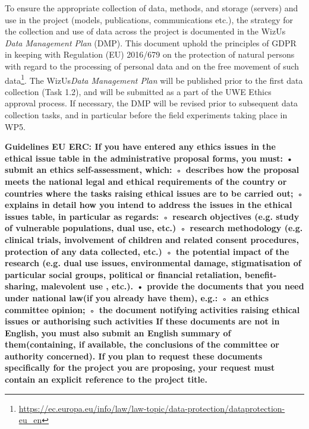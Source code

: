 \documentclass[11pt,a4paper]{report}
\newcommand{\project}{WizUs\xspace}
\newcommand{\eu}[1]{{\color{teal}\textbf{Guidelines EU ERC: #1}}}
\begin{document}
To ensure the appropriate collection of data, methods, and storage (servers) and
use in the project (models, publications, communications etc.), the strategy for
the collection and use of data across the project is documented in the \project
\emph{Data Management Plan} (DMP). This document uphold the principles of GDPR in
keeping with Regulation (EU) 2016/679 on the protection of natural persons with
regard to the processing of personal data and on the free movement of such
data\footnote{\url{https://ec.europa.eu/info/law/law-topic/data-protection/dataprotection-eu_en}}.
The \project \emph{Data Management Plan} will be published prior to the first
data collection (Task 1.2), and will be submitted as a part of the UWE Ethics
approval process. If necessary, the DMP will be revised prior to subsequent data
collection tasks, and in particular before the field experiments taking place in
WP5.

 
\eu{
If you have entered any ethics issues in the ethical issue table in the administrative proposal forms, you must:
    • submit an ethics self-assessment, which:
        ◦ describes how the proposal meets the national legal and ethical requirements of the country or countries where the tasks raising ethical issues are to be carried out;
        ◦ explains in detail how you intend to address the issues in the ethical issues table, in particular as regards:
        ◦ research objectives (e.g. study of vulnerable populations, dual use, etc.)
        ◦ research methodology (e.g. clinical trials, involvement of children and related consent procedures, protection of any data collected, etc.)
        ◦ the potential impact of the research (e.g. dual use issues, environmental damage, stigmatisation  of  particular  social  groups,  political  or  financial  retaliation, benefit-sharing,  malevolent use , etc.).
    • provide the documents that you need under national law(if you already have them), e.g.:
        ◦ an ethics committee opinion;
        ◦ the document notifying activities raising ethical issues or authorising such activities
 If these documents are not in English, you must also submit an English summary of them(containing, if available, the conclusions of the committee or authority concerned).
 If you plan to request these documents specifically for the project you are
 proposing, your request must contain an explicit reference to the project
 title.
}
\end{document}
